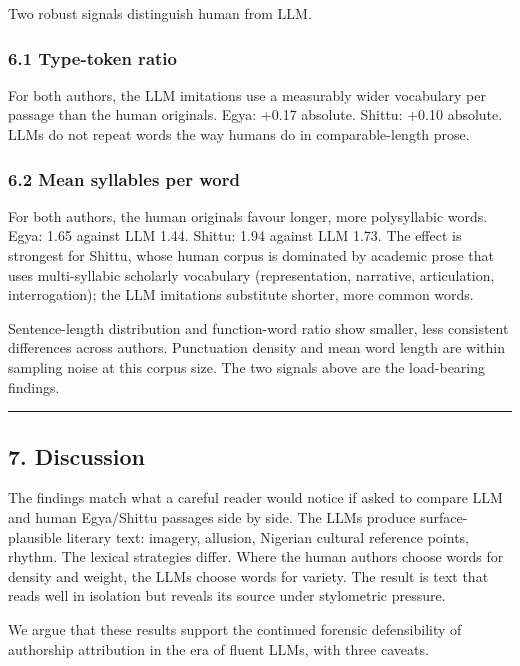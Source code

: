 Two robust signals distinguish human from LLM.

\subsubsection{6.1 Type-token ratio}\label{type-token-ratio}

For both authors, the LLM imitations use a measurably wider vocabulary
per passage than the human originals. Egya: +0.17 absolute. Shittu:
+0.10 absolute. LLMs do not repeat words the way humans do in
comparable-length prose.

\subsubsection{6.2 Mean syllables per
word}\label{mean-syllables-per-word}

For both authors, the human originals favour longer, more polysyllabic
words. Egya: 1.65 against LLM 1.44. Shittu: 1.94 against LLM 1.73. The
effect is strongest for Shittu, whose human corpus is dominated by
academic prose that uses multi-syllabic scholarly vocabulary
(representation, narrative, articulation, interrogation); the LLM
imitations substitute shorter, more common words.

Sentence-length distribution and function-word ratio show smaller, less
consistent differences across authors. Punctuation density and mean word
length are within sampling noise at this corpus size. The two signals
above are the load-bearing findings.

\begin{center}\rule{0.5\linewidth}{0.5pt}\end{center}

\subsection{7. Discussion}\label{discussion}

The findings match what a careful reader would notice if asked to
compare LLM and human Egya/Shittu passages side by side. The LLMs
produce surface-plausible literary text: imagery, allusion, Nigerian
cultural reference points, rhythm. The lexical strategies differ. Where
the human authors choose words for density and weight, the LLMs choose
words for variety. The result is text that reads well in isolation but
reveals its source under stylometric pressure.

We argue that these results support the continued forensic defensibility
of authorship attribution in the era of fluent LLMs, with three caveats.

